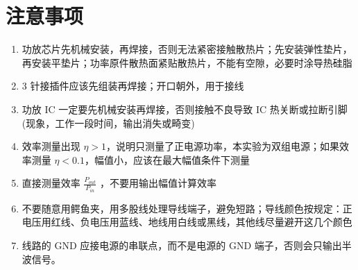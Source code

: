 \documentclass[UTF8]{article}
\begin{document}
\section{注意事项}

\begin{enumerate}
    \item 功放芯片先机械安装，再焊接，否则无法紧密接触散热片；先安装弹性垫片，再安装平垫片；功率原件散热面紧贴散热片，不能有空隙，必要时涂导热硅脂
    \item 3 针接插件应该先组装再焊接；开口朝外，用于接线
    \item 功放 IC 一定要先机械安装再焊接，否则接触不良导致 IC 热关断或拉断引脚 (现象，工作一段时间，输出消失或畸变)
    \item 效率测量出现 $\eta>1$，说明只测量了正电源功率，本实验为双组电源；如果效率测量 $\eta < 0.1$，幅值小，应该在最大幅值条件下测量
    \item 直接测量效率 $\frac{P_{out}}{P_{in}}$ ，不要用输出幅值计算效率
    \item 不要随意用鳄鱼夹，用多股线处理导线端子，避免短路；导线颜色按规定：正电压用红线、负电压用蓝线、地线用白线或黑线，其他线尽量避开这几个颜色
    \item 线路的 GND 应接电源的串联点，而不是电源的 GND 端子，否则会只输出半波信号。
\end{enumerate}




\end{document}
